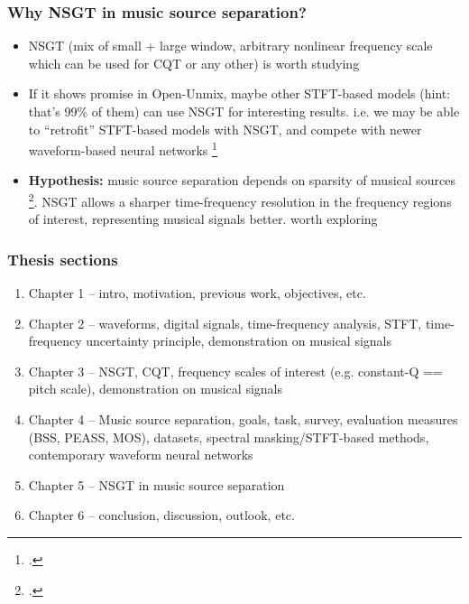 \documentclass[usenames,dvipsnames]{beamer}
\begin{document}
\begin{frame}
	\frametitle{Why NSGT in music source separation?}
	\begin{itemize}
		\item
			NSGT (mix of small + large window, arbitrary nonlinear frequency scale which can be used for CQT or any other) is worth studying
		\item
			If it shows promise in Open-Unmix, maybe other STFT-based models (hint: that's 99\% of them) can use NSGT for interesting results. i.e. we  may be able to ``retrofit'' STFT-based models with NSGT, and compete with newer waveform-based neural networks \footcite{demucs}
		 \item
			 \textbf{Hypothesis:} music source separation depends on sparsity of musical sources \footcite{musicsepgood}. NSGT allows a sharper time-frequency resolution in the frequency regions of interest, representing musical signals better. worth exploring
	\end{itemize}
\end{frame}

\begin{frame}
	\frametitle{Thesis sections}
	\begin{enumerate}
		\item
			Chapter 1 -- intro, motivation, previous work, objectives, etc.
		\item
			Chapter 2 -- waveforms, digital signals, time-frequency analysis, STFT, time-frequency uncertainty principle, demonstration on musical signals
		\item
			Chapter 3 -- NSGT, CQT, frequency scales of interest (e.g. constant-Q == pitch scale), demonstration on musical signals
		\item
			Chapter 4 -- Music source separation, goals, task, survey, evaluation measures (BSS, PEASS, MOS), datasets, spectral masking/STFT-based methods, contemporary waveform neural networks
		\item
			Chapter 5 -- NSGT in music source separation
		\item
			Chapter 6 -- conclusion, discussion, outlook, etc.
	\end{enumerate}
\end{frame}
\end{document}
